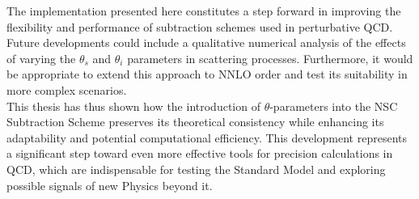 \documentclass[a4paper, 12pt]{book}
\begin{document}
The implementation presented here constitutes a step forward in improving the flexibility and performance of subtraction schemes used in perturbative QCD. Future developments could include a qualitative numerical analysis of the effects of varying the $\theta_s$ and $\theta_i$ parameters in scattering processes. Furthermore, it would be appropriate to extend this approach to NNLO order and test its suitability in more complex scenarios.\\
This thesis has thus shown how the introduction of $\theta$-parameters into the NSC Subtraction Scheme preserves its theoretical consistency while enhancing its adaptability and potential computational efficiency. This development represents a significant step toward even more effective tools for precision calculations in QCD, which are indispensable for testing the Standard Model and exploring possible signals of new Physics beyond it.

\clearpage
\end{document}
